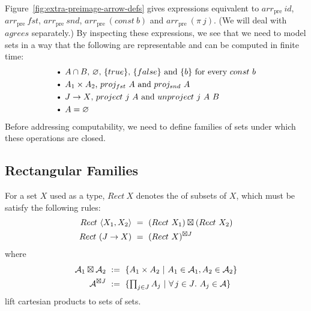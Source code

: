 \documentclass[preprint]{sigplanconf}
\newcommand{\arrowarr}{\ensuremath{arr}}
\newcommand{\pre}{_\mathrm{pre}}
\newcommand{\arrpre}{\arrowarr\pre}
\begin{document}
Figure~\ref{fig:extra-preimage-arrow-defs} gives expressions equivalent to $\arrpre~id$, $\arrpre~fst$, $\arrpre~snd$, $\arrpre~(const~b)$ and $\arrpre~(\pi~j)$.
(We will deal with $agrees$ separately.)
By inspecting these expressions, we see that we need to model sets in a way that
the following are representable and can be computed in finite time:
\begin{equation}
\begin{aligned}
	&\text{\textbullet\ $A \i B$, $\emptyset$, $\set{true}$, $\set{false}$ and $\set{b}$ for every $const~b$} \\
	&\text{\textbullet\ $A_1 \times A_2$, $proj_{fst}~A$ and $proj_{snd}~A$} \\
	&\text{\textbullet\ $J \to X$, $project~j~A$ and $unproject~j~A~B$} \\
	&\text{\textbullet\ $A = \emptyset$} \\
\end{aligned}
\label{eqn:exact-rectangle-ops}
\end{equation}
Before addressing computability, we need to define families of sets under which these operations are closed.

\subsection{Rectangular Families}

\begin{definition}
For a set $X$ used as a type, $Rect~X$ denotes the  of subsets of $X$, which must be satisfy the following rules:
\begin{align}
	Rect~\langle{X_1,X_2}\rangle &\ = \ (Rect~X_1) \boxtimes (Rect~X_2)
	\label{eqn:standard-rect-finite-product-rule}
\\
	Rect~(J \to X) &\ = \ (Rect~X)^{\boxtimes J}
	\label{eqn:standard-rect-arbitrary-product-rule}
\end{align}
where
\begin{align}
	\mathcal{A}_1 \boxtimes \mathcal{A}_2 &\ := \ \lbrace {A_1 \times A_2} \ \lvert\ {A_1 \in \mathcal{A}_1, A_2 \in \mathcal{A}_2} \rbrace \\
	\mathcal{A}^{\boxtimes J} &\ := \ \lbrace {\textstyle\prod_{j \in J} A_j} \ \lvert\ {\forall\,{j \in J}\ldotp\,{A_j \in \mathcal{A}}} \rbrace
\end{align}
lift cartesian products to sets of sets.
\label{def:standard-rectangle}
\end{definition}
\end{document}
